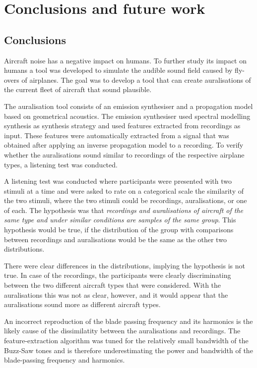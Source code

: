 \chapter{Conclusions and future work}\label{chapter:conclusions}

\section{Conclusions}


Aircraft noise has a negative impact on humans. To further study its impact on
humans a tool was developed to simulate the audible sound field caused by
fly-overs of airplanes. The goal was to develop a tool that can create
auralisations of the current fleet of aircraft that sound plausible.

The auralisation tool consists of an emission synthesiser and a propagation
model based on geometrical acoustics. The emission synthesiser used spectral
modelling synthesis as synthesis strategy and used features extracted from
recordings as input. These features were automatically extracted from a signal
that was obtained after applying an inverse propagation model to a recording.
To verify whether the auralisations sound similar to recordings of the
respective airplane types, a listening test was conducted.

A listening test was conducted where participants were presented with two stimuli
at a time and were asked to rate on a categorical scale the similarity of the two stimuli,
where the two stimuli could be recordings, auralisations, or one of each. The
hypothesis was that \emph{recordings and auralisations of aircraft of the same
type and under similar conditions are samples of the same group}. This
hypothesis would be true, if the distribution of the group with comparisons
between recordings and auralisations would be the same as the other two
distributions.

There were clear differences in the distributions, implying the hypothesis is
not true. In case of the recordings, the participants were clearly discriminating
between the two different aircraft types that were considered. With the
auralisations this was not as clear, however, and it would appear that the
auralisations sound more as different aircraft types.

An incorrect reproduction of the blade passing frequency and its harmonics is
the likely cause of the dissimilatity between the auralisations and recordings.
The feature-extraction algorithm was tuned for the relatively small bandwidth of
the Buzz-Saw tones and is therefore underestimating the power and bandwidth of
the blade-passing frequency and harmonics.

